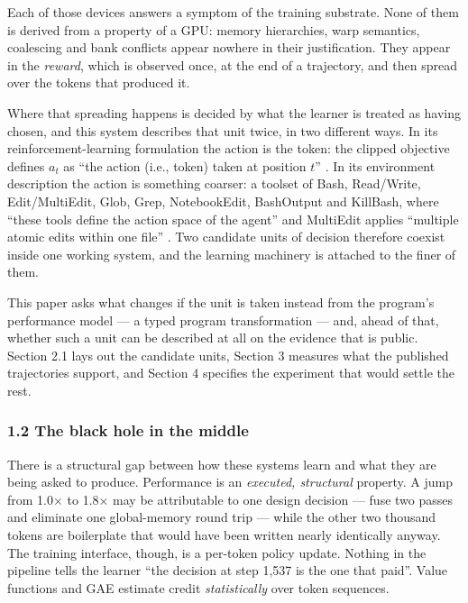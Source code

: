 \documentclass[
  11pt,
]{article}
\begin{document}
Each of those devices answers a symptom of the training substrate. None of them is derived from a property of a GPU: memory hierarchies, warp semantics, coalescing and bank conflicts appear nowhere in their justification. They appear in the \emph{reward}, which is observed once, at the end of a trajectory, and then spread over the tokens that produced it.

Where that spreading happens is decided by what the learner is treated as having chosen, and this system describes that unit twice, in two different ways. In its reinforcement-learning formulation the action is the token: the clipped objective defines \(a_t\) as ``the action (i.e., token) taken at position \(t\)'' \cite[Sec.~ 5.2]{cuda1}. In its environment description the action is something coarser: a toolset of Bash, Read/Write, Edit/MultiEdit, Glob, Grep, NotebookEdit, BashOutput and KillBash, where ``these tools define the action space of the agent'' and MultiEdit applies ``multiple atomic edits within one file'' \cite[App.~ Details of Agent Loop]{cuda1}. Two candidate units of decision therefore coexist inside one working system, and the learning machinery is attached to the finer of them.

This paper asks what changes if the unit is taken instead from the program's performance model --- a typed program transformation --- and, ahead of that, whether such a unit can be described at all on the evidence that is public. Section 2.1 lays out the candidate units, Section 3 measures what the published trajectories support, and Section 4 specifies the experiment that would settle the rest.

\hypertarget{the-black-hole-in-the-middle}{%
\subsubsection{1.2 The black hole in the middle}\label{the-black-hole-in-the-middle}}

There is a structural gap between how these systems learn and what they are being asked to produce. Performance is an \emph{executed, structural} property. A jump from 1.0× to 1.8× may be attributable to one design decision --- fuse two passes and eliminate one global-memory round trip --- while the other two thousand tokens are boilerplate that would have been written nearly identically anyway. The training interface, though, is a per-token policy update. Nothing in the pipeline tells the learner ``the decision at step 1,537 is the one that paid''. Value functions and GAE estimate credit \emph{statistically} over token sequences.
\end{document}
